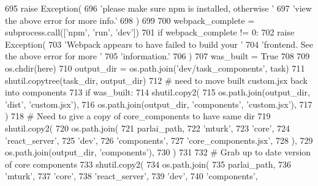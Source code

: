 \begin{DoxyCode}
695                 \textcolor{keywordflow}{raise} Exception(
696                     \textcolor{stringliteral}{'please make sure npm is installed, otherwise '}
697                     \textcolor{stringliteral}{'view the above error for more info.'}
698                 )
699 
700             webpack\_complete = subprocess.call([\textcolor{stringliteral}{'npm'}, \textcolor{stringliteral}{'run'}, \textcolor{stringliteral}{'dev'}])
701             \textcolor{keywordflow}{if} webpack\_complete != 0:
702                 \textcolor{keywordflow}{raise} Exception(
703                     \textcolor{stringliteral}{'Webpack appears to have failed to build your '}
704                     \textcolor{stringliteral}{'frontend. See the above error for more '}
705                     \textcolor{stringliteral}{'information.'}
706                 )
707             was\_built = \textcolor{keyword}{True}
708 
709         os.chdir(here)
710         output\_dir = os.path.join(\textcolor{stringliteral}{'dev/task\_components'}, task)
711         shutil.copytree(task\_dir, output\_dir)
712         \textcolor{comment}{# need to move built custom.jsx back into components}
713         \textcolor{keywordflow}{if} was\_built:
714             shutil.copy2(
715                 os.path.join(output\_dir, \textcolor{stringliteral}{'dist'}, \textcolor{stringliteral}{'custom.jsx'}),
716                 os.path.join(output\_dir, \textcolor{stringliteral}{'components'}, \textcolor{stringliteral}{'custom.jsx'}),
717             )
718         \textcolor{comment}{# Need to give a copy of core\_components to have same dir}
719         shutil.copy2(
720             os.path.join(
721                 parlai\_path,
722                 \textcolor{stringliteral}{'mturk'},
723                 \textcolor{stringliteral}{'core'},
724                 \textcolor{stringliteral}{'react\_server'},
725                 \textcolor{stringliteral}{'dev'},
726                 \textcolor{stringliteral}{'components'},
727                 \textcolor{stringliteral}{'core\_components.jsx'},
728             ),
729             os.path.join(output\_dir, \textcolor{stringliteral}{'components'}),
730         )
731 
732     \textcolor{comment}{# Grab up to date version of core components}
733     shutil.copy2(
734         os.path.join(
735             parlai\_path,
736             \textcolor{stringliteral}{'mturk'},
737             \textcolor{stringliteral}{'core'},
738             \textcolor{stringliteral}{'react\_server'},
739             \textcolor{stringliteral}{'dev'},
740             \textcolor{stringliteral}{'components'},

\end{DoxyCode}
